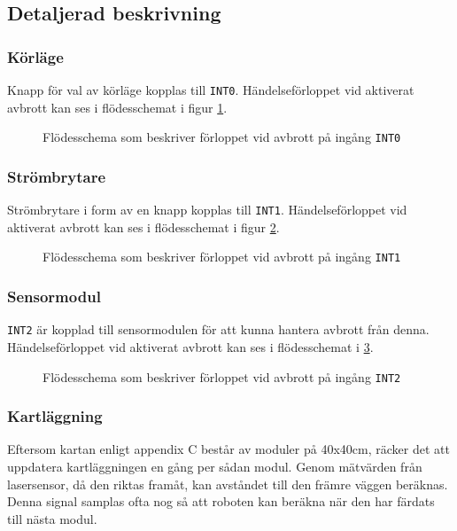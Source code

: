 \documentclass[11pt]{article}
\begin{document}
\begin{flushleft}
\subsection{Detaljerad beskrivning}
\subsubsection {Körläge}
Knapp för val av körläge kopplas till \verb+INT0+. Händelseförloppet vid aktiverat avbrott kan ses i flödesschemat i figur \ref{avbrott_korlage}.

\begin{figure}[htbp]
\centering
\noindent\resizebox{.6\linewidth}{!}{
	}
	\cprotect\caption{Flödesschema som beskriver förloppet vid avbrott på ingång \verb+INT0+ \label{avbrott_korlage}}	
\end{figure}

\subsubsection {Strömbrytare}
Strömbrytare i form av en knapp kopplas till \verb+INT1+. Händelseförloppet vid aktiverat avbrott kan ses i flödesschemat i figur \ref{avbrott_strombrytare}. 

\begin{figure}[htbp]
\centering
\noindent\resizebox{.6\linewidth}{!}{
	}
	\cprotect\caption{Flödesschema som beskriver förloppet vid avbrott på ingång \verb+INT1+ \label{avbrott_strombrytare}}	
\end{figure}

\subsubsection {Sensormodul} 
\verb+INT2+ är kopplad till sensormodulen för att kunna hantera avbrott från denna. Händelseförloppet vid aktiverat avbrott kan ses i flödesschemat i \ref{avbrott_sensormodul}.

\begin{figure}[htbp]
\centering
\noindent\resizebox{1\linewidth}{!}{
	}
	\cprotect\caption{Flödesschema som beskriver förloppet vid avbrott på ingång \verb+INT2+ \label{avbrott_sensormodul}}	
\end{figure}

\subsubsection{Kartläggning}
Eftersom kartan enligt appendix C består av moduler på 40x40cm, räcker det att uppdatera kartläggningen en gång per sådan modul. Genom mätvärden från lasersensor, då den riktas framåt, kan avståndet till den främre väggen beräknas. Denna signal samplas ofta nog så att roboten kan beräkna när den har färdats till nästa modul. 


\end{flushleft}
\end{document}
